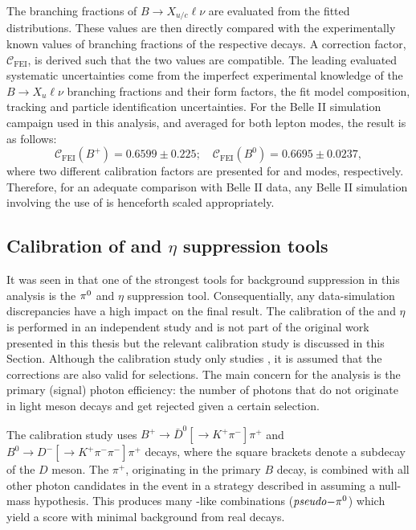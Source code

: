 The branching fractions of $B\rightarrow X_{u/c}\ell\nu$ are evaluated from the fitted distributions.
These values are then directly compared with the experimentally known values of branching fractions of the respective decays.
A correction factor, $\mathcal{C}_{\mathrm{FEI}}$, is derived such that the two values are compatible.
The leading evaluated systematic uncertainties come from the imperfect experimental knowledge of the $B\rightarrow X_u\ell\nu$ branching fractions and their form factors, the fit model composition, tracking and particle identification uncertainties.
For the Belle II simulation campaign used in this analysis, and averaged for both lepton modes, the result is as follows:
\begin{equation}\label{eq:fei_calibration}
    \mathcal{C}_{\mathrm{FEI}}(B^+) = 0.6599 \pm 0.225; \quad \mathcal{C}_{\mathrm{FEI}}(B^0) = 0.6695 \pm 0.0237,
\end{equation}
where two different calibration factors are presented for \feiBp and \feiBz modes, respectively.
Therefore, for an adequate comparison with Belle II data, any Belle II simulation involving the use of \FEI is henceforth scaled appropriately.

\subsection{Calibration of \texorpdfstring{\piz}{pi0} and \texorpdfstring{$\eta$}{eta} suppression tools}\label{sec:piz_eta_calibration}
It was seen in  that one of the strongest tools for background suppression in this analysis is the $\pi^0$ and $\eta$ suppression tool.
Consequentially, any data-simulation discrepancies have a high impact on the final result.
The calibration of the \piz and $\eta$ is performed in an independent study and is not part of the original work presented in this thesis 
but the relevant calibration study is discussed in this Section.
Although the calibration study only studies \piVeto, it is assumed that the corrections are also valid for \etaVeto selections.
The main concern for the \BtoXsgamma analysis is the primary (signal) photon efficiency: the number of photons that do not originate in light meson decays and get rejected given a certain \piVeto selection.

The calibration study uses $B^+\to \bar{D}^0[\to K^+\pi^-]\pi^+$ and $B^0\to D^-[\to K^+\pi^-\pi^-]\pi^+$ decays, where the square brackets denote a subdecay of the $D$ meson.
The $\pi^+$, originating in the primary $B$ decay, is combined with all other photon candidates in the event in a strategy described in  assuming a null-mass hypothesis.
This produces many \piz-like combinations ($\mathit{pseudo}\mathrm{-}\pi^0$) which yield a \piVeto score with minimal background from real \piz decays.

